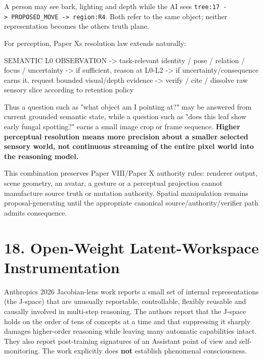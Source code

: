 \documentclass[
  10pt,
  letterpaper,
]{article}
\newenvironment{Shaded}{}{}
\newcommand{\NormalTok}[1]{#1}
\begin{document}
A person may see bark, lighting and depth while the AI sees
\texttt{tree:17\ -\textgreater{}\ PROPOSED\_MOVE\ -\textgreater{}\ region:R4}.
Both refer to the same object; neither representation becomes the
other\textquotesingle s truth plane.

For perception, Paper X\textquotesingle s resolution law extends
naturally:

\begin{Shaded}
\begin{Highlighting}[]
\NormalTok{SEMANTIC L0 OBSERVATION}
\NormalTok{ {-}\textgreater{} task{-}relevant identity / pose / relation / focus / uncertainty}
\NormalTok{ {-}\textgreater{} if sufficient, reason at L0{-}L2}
\NormalTok{ {-}\textgreater{} if uncertainty/consequence earns it, request bounded visual/depth evidence}
\NormalTok{ {-}\textgreater{} verify / cite / dissolve raw sensory slice according to retention policy}
\end{Highlighting}
\end{Shaded}

Thus a question such as "what object am I pointing at?" may be answered
from current grounded semantic state, while a question such as "does
this leaf show early fungal spotting?" earns a small image crop or frame
sequence. \textbf{Higher perceptual resolution means more precision
about a smaller selected sensory world, not continuous streaming of the
entire pixel world into the reasoning model.}

This combination preserves Paper VIII/Paper X authority rules: renderer
output, scene geometry, an avatar, a gesture or a perceptual projection
cannot manufacture source truth or mutation authority. Spatial
manipulation remains proposal-generating until the appropriate canonical
source/authority/verifier path admits consequence.

\section{18. Open-Weight Latent-Workspace
Instrumentation}\label{18-open-weight-latent-workspace-instrumentation}

Anthropic\textquotesingle s 2026 Jacobian-lens work reports a small set
of internal representations (the J-space) that are unusually reportable,
controllable, flexibly reusable and causally involved in multi-step
reasoning. The authors report that the J-space holds on the order of
tens of concepts at a time and that suppressing it sharply damages
higher-order reasoning while leaving many automatic capabilities intact.
They also report post-training signatures of an Assistant point of view
and self-monitoring. The work explicitly does \textbf{not} establish
phenomenal consciousness.
\end{document}
